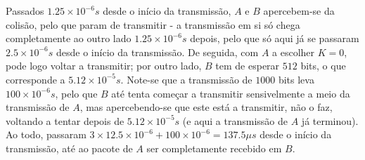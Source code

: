 \begin{enumerate}[leftmargin=\labelsep]
        Passados $1.25 \times 10^{-6} s$ desde o início da transmissão, $A$ e $B$
        apercebem-se da colisão, pelo que param de transmitir - a transmissão em
        si só chega completamente ao outro lado $1.25 \times 10^{-6} s$ depois,
        pelo que só aqui já se passaram $2.5 \times 10^{-6} s$ desde o início da
        transmissão. De seguida, com $A$ a escolher $K=0$, pode logo voltar a
        transmitir; por outro lado, $B$ tem de esperar $512$ bits, o que corresponde
        a $5.12 \times 10^{-5}s$. Note-se que a transmissão de $1000$ bits leva
        $100 \times 10^{-6} s$, pelo que $B$ até tenta começar a transmitir sensivelmente
        a meio da transmissão de $A$, mas apercebendo-se que este está a transmitir,
        não o faz, voltando a tentar depois de $5.12 \times 10^{-5}s$ (e aqui a
        transmissão de $A$ já terminou). Ao todo, passaram $3 \times 12.5 \times 10^{-6} + 100 \times 10^{-6} = 137.5 \mu s$
        desde o início da transmissão, até ao pacote de $A$ ser completamente
        recebido em $B$.

\end{enumerate}